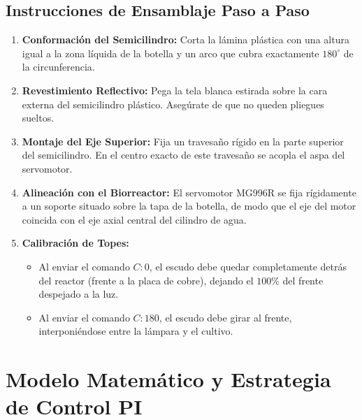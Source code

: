 \documentclass[11pt,letterpaper]{article}
\begin{document}
\subsection{Instrucciones de Ensamblaje Paso a Paso}
\begin{enumerate}
    \item \textbf{Conformación del Semicilindro:} Corta la lámina plástica con una altura igual a la zona líquida de la botella y un arco que cubra exactamente $180^\circ$ de la circunferencia.
    \item \textbf{Revestimiento Reflectivo:} Pega la tela blanca estirada sobre la cara externa del semicilindro plástico. Asegúrate de que no queden pliegues sueltos.
    \item \textbf{Montaje del Eje Superior:} Fija un travesaño rígido en la parte superior del semicilindro. En el centro exacto de este travesaño se acopla el aspa del servomotor.
    \item \textbf{Alineación con el Biorreactor:} El servomotor MG996R se fija rígidamente a un soporte situado sobre la tapa de la botella, de modo que el eje del motor coincida con el eje axial central del cilindro de agua.
    \item \textbf{Calibración de Topes:} 
    \begin{itemize}
        \item Al enviar el comando $C:0$, el escudo debe quedar completamente detrás del reactor (frente a la placa de cobre), dejando el $100\%$ del frente despejado a la luz.
        \item Al enviar el comando $C:180$, el escudo debe girar al frente, interponiéndose entre la lámpara y el cultivo.
    \end{itemize}
\end{enumerate}

\section{Modelo Matemático y Estrategia de Control PI}
\end{document}
